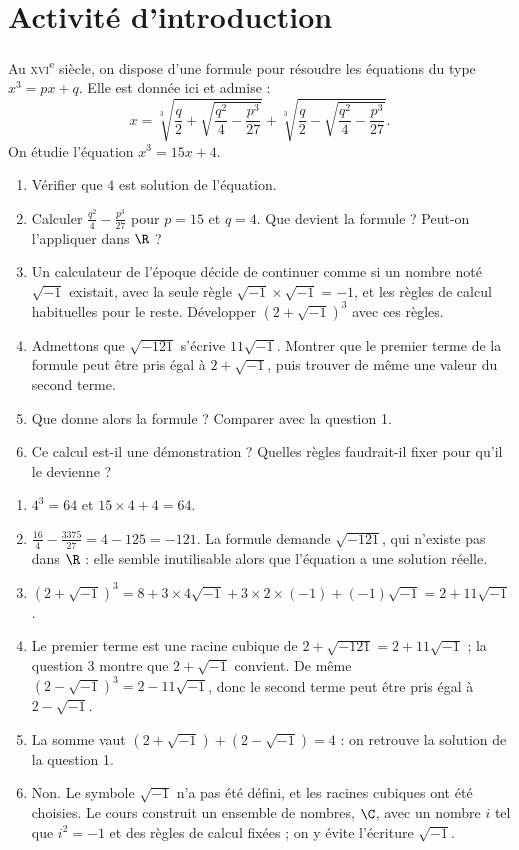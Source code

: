 \mxnewpage
\section{Activité d'introduction}
\begin{activity}
Au \textsc{xvi}\textsuperscript{e} siècle, on dispose d'une formule pour résoudre les équations du type $x^3=px+q$. Elle est donnée ici et admise :
\[x=\sqrt[3]{\frac q2+\sqrt{\frac{q^2}{4}-\frac{p^3}{27}}}+\sqrt[3]{\frac q2-\sqrt{\frac{q^2}{4}-\frac{p^3}{27}}}.\]
On étudie l'équation $x^3=15x+4$.
\begin{enumerate}
\item Vérifier que $4$ est solution de l'équation.
\item Calculer $\frac{q^2}{4}-\frac{p^3}{27}$ pour $p=15$ et $q=4$. Que devient la formule ? Peut-on l'appliquer dans $\R$ ?
\item Un calculateur de l'époque décide de continuer comme si un nombre noté $\sqrt{-1}$ existait, avec la seule règle $\sqrt{-1}\times\sqrt{-1}=-1$, et les règles de calcul habituelles pour le reste. Développer $\left(2+\sqrt{-1}\right)^3$ avec ces règles.
\item Admettons que $\sqrt{-121}$ s'écrive $11\sqrt{-1}$. Montrer que le premier terme de la formule peut être pris égal à $2+\sqrt{-1}$, puis trouver de même une valeur du second terme.
\item Que donne alors la formule ? Comparer avec la question 1.
\item Ce calcul est-il une démonstration ? Quelles règles faudrait-il fixer pour qu'il le devienne ?
\end{enumerate}
\end{activity}
\begin{solution}[Activité]
\begin{enumerate}
\item $4^3=64$ et $15\times4+4=64$.
\item $\frac{16}{4}-\frac{\num{3375}}{27}=4-125=-121$. La formule demande $\sqrt{-121}$, qui n'existe pas dans $\R$ : elle semble inutilisable alors que l'équation a une solution réelle.
\item $\left(2+\sqrt{-1}\right)^3=8+3\times4\sqrt{-1}+3\times2\times(-1)+(-1)\sqrt{-1}=2+11\sqrt{-1}$.
\item Le premier terme est une racine cubique de $2+\sqrt{-121}=2+11\sqrt{-1}$ ; la question 3 montre que $2+\sqrt{-1}$ convient. De même $\left(2-\sqrt{-1}\right)^3=2-11\sqrt{-1}$, donc le second terme peut être pris égal à $2-\sqrt{-1}$.
\item La somme vaut $\left(2+\sqrt{-1}\right)+\left(2-\sqrt{-1}\right)=4$ : on retrouve la solution de la question 1.
\item Non. Le symbole $\sqrt{-1}$ n'a pas été défini, et les racines cubiques ont été choisies. Le cours construit un ensemble de nombres, $\C$, avec un nombre $i$ tel que $i^2=-1$ et des règles de calcul fixées ; on y évite l'écriture $\sqrt{-1}$.
\end{enumerate}
\end{solution}
